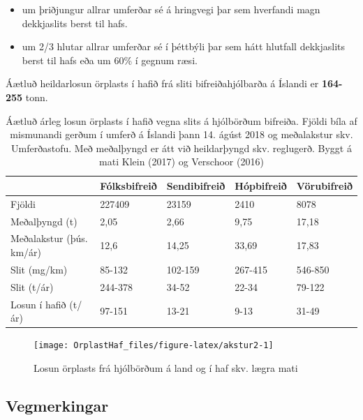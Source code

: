 \documentclass[icelandic,]{book}
\providecommand{\tightlist}{%
  \setlength{\itemsep}{0pt}\setlength{\parskip}{0pt}}
\begin{document}
\begin{itemize}
\tightlist
\item
  um þriðjungur allrar umferðar sé á hringvegi þar sem hverfandi magn dekkjaslits berst til hafs.
\item
  um 2/3 hlutar allrar umferðar sé í þéttbýli þar sem hátt hlutfall dekkjaslits berst til hafs eða um 60\% í gegnum ræsi.
\end{itemize}

Áætluð heildarlosun örplasts í hafið frá sliti bifreiðahjólbarða á Íslandi er \textbf{164-255} tonn.

\begin{table}[t]

\caption{\label{tab:akstur}Áætluð árleg losun örplasts í hafið vegna slits á hjólbörðum bifreiða. Fjöldi bíla af mismunandi gerðum í umferð á Íslandi þann 14. ágúst 2018 og meðalakstur skv. Umferðastofu. Með meðalþyngd er átt við heildarþyngd skv. reglugerð. Byggt á mati Klein (2017) og Verschoor (2016)}
\centering
\begin{tabular}{lllll}
\toprule
  & Fólksbifreið & Sendibifreið & Hópbifreið & Vörubifreið\\
\midrule
Fjöldi & 227409 & 23159 & 2410 & 8078\\
Meðalþyngd (t) & 2,05 & 2,66 & 9,75 & 17,18\\
Meðalakstur (þús. km/ár) & 12,6 & 14,25 & 33,69 & 17,83\\
Slit (mg/km) & 85-132 & 102-159 & 267-415 & 546-850\\
Slit (t/ár) & 244-378 & 34-52 & 22-34 & 79-122\\
\addlinespace
Losun í hafið (t/ár) & 97-151 & 13-21 & 9-13 & 31-49\\
\bottomrule
\end{tabular}
\end{table}

\begin{figure}

{\centering \texttt{[image: OrplastHaf\_files/figure-latex/akstur2-1]} 

}

\caption{Losun örplasts frá hjólbörðum á land og í haf skv. lægra mati}\label{fig:akstur2}
\end{figure}

\hypertarget{vegmerkingar}{%
\subsection*{Vegmerkingar}\label{vegmerkingar}}
\end{document}
